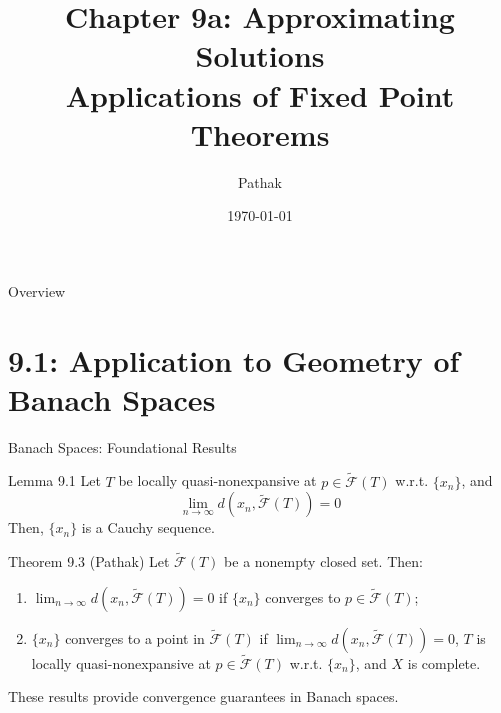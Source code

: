 \documentclass[aspectratio=169,10pt]{beamer}
\title[Chapter 9a: Approximating Solutions]{Chapter 9a: Approximating Solutions \\Applications of Fixed Point Theorems}
\author{Pathak}
\date{\today}
\institute{Nonlinear Analysis and Fixed Point Theory}
\begin{document}
\frame{\titlepage}

\begin{frame}{Overview}
    \tableofcontents
\end{frame}

\section{9.1: Application to Geometry of Banach Spaces}

\begin{frame}{Banach Spaces: Foundational Results}
    \begin{block}{Lemma 9.1}
        Let $T$ be locally quasi-nonexpansive at $p \in \tilde{\mathcal{F}}(T)$ w.r.t. $\{x_n\}$, and
        \[\lim_{n \to \infty} d(x_n, \tilde{\mathcal{F}}(T)) = 0\]
        Then, $\{x_n\}$ is a Cauchy sequence.
    \end{block}

    \vspace{0.3cm}

    \begin{block}{Theorem 9.3 (Pathak)}
        Let $\tilde{\mathcal{F}}(T)$ be a nonempty closed set. Then:
        \begin{enumerate}
            \item $\displaystyle \lim_{n \to \infty} d(x_n, \tilde{\mathcal{F}}(T)) = 0$ if $\{x_n\}$ converges to $p \in \tilde{\mathcal{F}}(T)$;
            \item $\{x_n\}$ converges to a point in $\tilde{\mathcal{F}}(T)$ if $\displaystyle \lim_{n \to \infty} d(x_n, \tilde{\mathcal{F}}(T)) = 0$, $T$ is locally quasi-nonexpansive at $p \in \tilde{\mathcal{F}}(T)$ w.r.t. $\{x_n\}$, and $X$ is complete.
        \end{enumerate}
    \end{block}

    \vspace{0.3cm}
    These results provide convergence guarantees in Banach spaces.
\end{frame}
\end{document}
